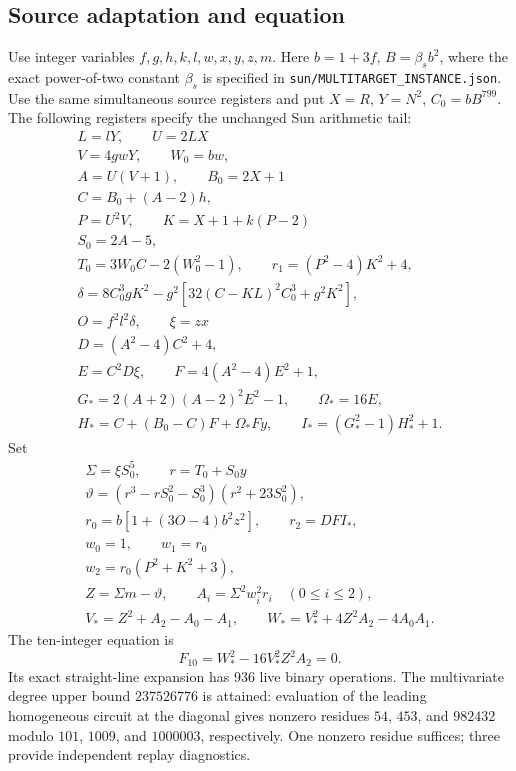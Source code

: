 \documentclass[11pt]{article}
\begin{document}
\subsection{Source adaptation and equation}
Use integer variables $f,g,h,k,l,w,x,y,z,m$. Here
$b=1+3f$, $B=\beta_s b^2$, where the exact power-of-two constant $\beta_s$
is specified in \texttt{sun/MULTITARGET\_INSTANCE.json}. Use the same
simultaneous source registers and put $X=R$, $Y=N^2$, $C_0=bB^{799}$.
The following registers specify the unchanged Sun arithmetic tail:
\[\begin{gathered}
L=lY,\qquad U=2LX\\
V=4gwY,\qquad W_0=bw,\\
A=U(V+1),\qquad B_0=2X+1\\
C=B_0+(A-2)h,\\
P=U^2V,\qquad K=X+1+k(P-2)\\
S_0=2A-5,\\
T_0=3W_0C-2(W_0^2-1),\qquad r_1=(P^2-4)K^2+4,\\
\delta=8C_0^3gK^2-g^2[32(C-KL)^2C_0^3+g^2K^2],\\
O=f^2l^2\delta,\qquad \xi=zx\\
D=(A^2-4)C^2+4,\\
E=C^2D\xi,\qquad F=4(A^2-4)E^2+1,\\
G_*=2(A+2)(A-2)^2E^2-1,\qquad \Omega_*=16E,\\
H_*=C+(B_0-C)F+\Omega_*Fy,\qquad I_*=(G_*^2-1)H_*^2+1.
\end{gathered}\]
Set
\[\begin{gathered}
\Sigma=\xi S_0^5,\qquad r=T_0+S_0y\\
\vartheta=(r^3-rS_0^2-S_0^3)(r^2+23S_0^2),\\
r_0=b[1+(3O-4)b^2z^2],\qquad r_2=DFI_*,\\
w_0=1,\qquad w_1=r_0\\
w_2=r_0(P^2+K^2+3),\\
Z=\Sigma m-\vartheta,\qquad A_i=\Sigma^2w_i^2r_i\quad(0\le i\le2),\\
V_*=Z^2+A_2-A_0-A_1,\qquad W_*=V_*^2+4Z^2A_2-4A_0A_1.
\end{gathered}\]
The ten-integer equation is
\begin{equation}\label{eq:ten}
 \boxed{\ F_{10}=W_*^2-16V_*^2Z^2A_2=0.\ }
\end{equation}
Its exact straight-line expansion has 936 live binary operations. The
multivariate degree upper bound $237526776$ is attained: evaluation of the
leading homogeneous circuit at the diagonal gives nonzero residues $54$,
$453$, and $982432$ modulo $101$, $1009$, and $1000003$, respectively.
One nonzero residue suffices; three provide independent replay diagnostics.
\end{document}
